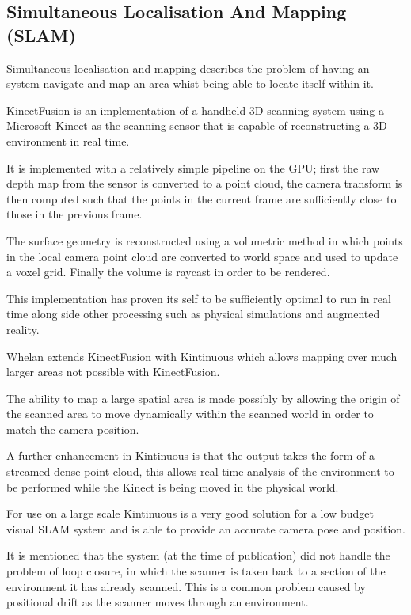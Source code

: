 \documentclass{entcs}
\begin{document}
\subsection{Simultaneous Localisation And Mapping (SLAM)}

Simultaneous localisation and mapping describes the problem of having an system
navigate and map an area whist being able to locate itself within it.

KinectFusion \cite{Izadi2011} is an implementation of a handheld 3D scanning
system using a Microsoft Kinect as the scanning sensor that is capable of
reconstructing a 3D environment in real time.

It is implemented with a relatively simple pipeline on the GPU; first the raw
depth map from the sensor is converted to a point cloud, the camera transform is
then computed such that the points in the current frame are sufficiently close
to those in the previous frame.

The surface geometry is reconstructed using a volumetric method in which points
in the local camera point cloud are converted to world space and used to update
a voxel grid. Finally the volume is raycast in order to be rendered.

This implementation has proven its self to be sufficiently optimal to run in
real time along side other processing such as physical simulations and augmented
reality.

Whelan extends KinectFusion with Kintinuous \cite{Whelan2012} which allows
mapping over much larger areas not possible with KinectFusion.

The ability to map a large spatial area is made possibly by allowing the origin
of the scanned area to move dynamically within the scanned world in order to
match the camera position.

A further enhancement in Kintinuous is that the output takes the form of a
streamed dense point cloud, this allows real time analysis of the environment to
be performed while the Kinect is being moved in the physical world.

For use on a large scale Kintinuous is a very good solution for a low budget
visual SLAM system and is able to provide an accurate camera pose and position.

It is mentioned that the system (at the time of publication) did not handle the
problem of loop closure, in which the scanner is taken back to a section of the
environment it has already scanned. This is a common problem caused by
positional drift as the scanner moves through an environment.
\end{document}
